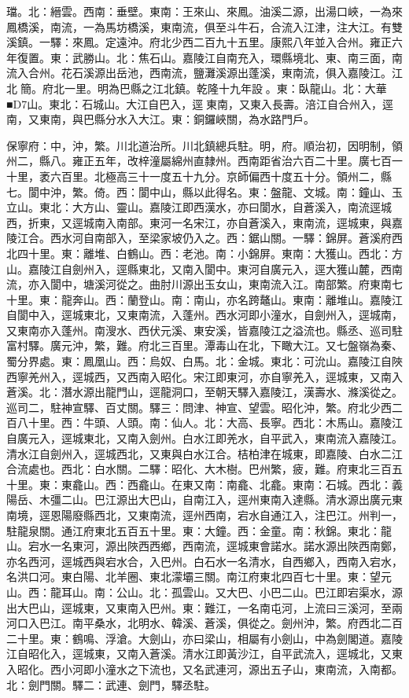 \begin{pinyinscope}
璫。北：縉雲。西南：垂壁。東南：王來山、來鳳。油溪二源，出湯口峽，一為來鳳橋溪，南流，一為馬坊橋溪，東南流，俱至斗牛石，合流入江津，注大江。有雙溪鎮。一驛：來鳳。定遠沖。府北少西二百九十五里。康熙八年並入合州。雍正六年復置。東：武勝山。北：焦石山。嘉陵江自南充入，環縣境北、東、南三面，南流入合州。花石溪源出岳池，西南流，鹽灘溪源出蓬溪，東南流，俱入嘉陵江。江北簡。府北一里。明為巴縣之江北鎮。乾隆十九年設。東：臥龍山。北：大華■D7山。東北：石城山。大江自巴入，逕東南，又東入長壽。涪江自合州入，逕南，又東南，與巴縣分水入大江。東：銅鑼峽關，為水路門戶。

保寧府：中，沖，繁。川北道治所。川北鎮總兵駐。明，府。順治初，因明制，領州二，縣八。雍正五年，改梓潼屬綿州直隸州。西南距省治六百二十里。廣七百一十里，袤六百里。北極高三十一度五十九分。京師偏西十度五十分。領州二，縣七。閬中沖，繁。倚。西：閬中山，縣以此得名。東：盤龍、文城。南：鐘山、玉立山。東北：大方山、靈山。嘉陵江即西漢水，亦曰閬水，自蒼溪入，南流逕城西，折東，又逕城南入南部。東河一名宋江，亦自蒼溪入，東南流，逕城東，與嘉陵江合。西水河自南部入，至梁家坡仍入之。西：鋸山關。一驛：錦屏。蒼溪府西北四十里。東：離堆、白鶴山。西：老池。南：小錦屏。東南：大獲山。西北：方山。嘉陵江自劍州入，逕縣東北，又南入閬中。東河自廣元入，逕大獲山麓，西南流，亦入閬中，塘溪河從之。曲肘川源出玉女山，東南流入江。南部繁。府東南七十里。東：龍奔山。西：蘭登山。南：南山，亦名跨鼇山。東南：離堆山。嘉陵江自閬中入，逕城東北，又東南流，入蓬州。西水河即小潼水，自劍州入，逕城南，又東南亦入蓬州。南溲水、西伏元溪、東安溪，皆嘉陵江之溢流也。縣丞、巡司駐富村驛。廣元沖，繁，難。府北三百里。潭毒山在北，下瞰大江。又七盤嶺為秦、蜀分界處。東：鳳凰山。西：烏奴、白馬。北：金城。東北：可沇山。嘉陵江自陜西寧羌州入，逕城西，又西南入昭化。宋江即東河，亦自寧羌入，逕城東，又南入蒼溪。北：潛水源出龍門山，逕龍洞口，至朝天驛入嘉陵江，漢壽水、滌溪從之。巡司二，駐神宣驛、百丈關。驛三：問津、神宣、望雲。昭化沖，繁。府北少西二百八十里。西：牛頭、人頭。南：仙人。北：大高、長寧。西北：木馬山。嘉陵江自廣元入，逕城東北，又南入劍州。白水江即羌水，自平武入，東南流入嘉陵江。清水江自劍州入，逕城西北，又東與白水江合。桔柏津在城東，即嘉陵、白水二江合流處也。西北：白水關。二驛：昭化、大木樹。巴州繁，疲，難。府東北三百五十里。東：東龕山。西：西龕山。在東又南：南龕、北龕。東南：石城。西北：義陽岳、木彊二山。巴江源出大巴山，自南江入，逕州東南入達縣。清水源出廣元東南境，逕恩陽廢縣西北，又東南流，逕州西南，宕水自通江入，注巴江。州判一，駐龍泉關。通江府東北五百五十里。東：大鐘。西：金童。南：秋錦。東北：龍山。宕水一名東河，源出陜西西鄉，西南流，逕城東會諾水。諾水源出陜西南鄭，亦名西河，逕城西與宕水合，入巴州。白石水一名清水，自西鄉入，西南入宕水，名洪口河。東白陽、北羊圈、東北濛壩三關。南江府東北四百七十里。東：望元山。西：龍耳山。南：公山。北：孤雲山。又大巴、小巴二山。巴江即宕渠水，源出大巴山，逕城東，又東南入巴州。東：難江，一名南屯河，上流曰三溪河，至兩河口入巴江。南平桑水，北明水、韓溪、蒼溪，俱從之。劍州沖，繁。府西北二百二十里。東：鶴鳴、浮滄。大劍山，亦曰梁山，相屬有小劍山，中為劍閣道。嘉陵江自昭化入，逕城東，又南入蒼溪。清水江即黃沙江，自平武流入，逕城北，又東入昭化。西小河即小潼水之下流也，又名武連河，源出五子山，東南流，入南都。北：劍門關。驛二：武連、劍門，驛丞駐。


\end{pinyinscope}

